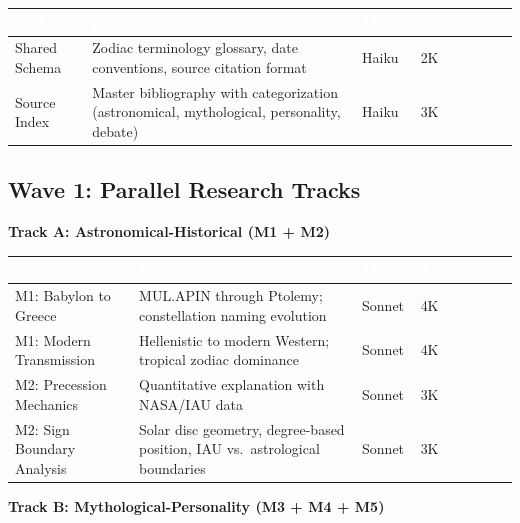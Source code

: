 \documentclass[11pt,letterpaper]{article}
\newcommand{\tableheader}[1]{\textbf{\sffamily\textcolor{white}{#1}}}
\begin{document}
\begin{center}
\begin{tabularx}{\textwidth}{L{3cm}XC{1.5cm}C{1.5cm}}
\toprule
{}
\tableheader{Task} & \tableheader{Description} & \tableheader{Model} & \tableheader{Est.\ Tokens} \\
\midrule
Shared Schema & Zodiac terminology glossary, date conventions, source citation format & Haiku & 2K \\
Source Index & Master bibliography with categorization (astronomical, mythological, personality, debate) & Haiku & 3K \\
\bottomrule
\end{tabularx}
\end{center}

\subsection{Wave 1: Parallel Research Tracks}

\textbf{Track A: Astronomical-Historical (M1 + M2)}

\begin{center}
\begin{tabularx}{\textwidth}{L{3cm}XC{1.5cm}C{1.5cm}}
\toprule
{}
\tableheader{Task} & \tableheader{Description} & \tableheader{Model} & \tableheader{Est.\ Tokens} \\
\midrule
M1: Babylon to Greece & MUL.APIN through Ptolemy; constellation naming evolution & Sonnet & 4K \\
M1: Modern Transmission & Hellenistic to modern Western; tropical zodiac dominance & Sonnet & 4K \\
M2: Precession Mechanics & Quantitative explanation with NASA/IAU data & Sonnet & 3K \\
M2: Sign Boundary Analysis & Solar disc geometry, degree-based position, IAU vs.\ astrological boundaries & Sonnet & 3K \\
\bottomrule
\end{tabularx}
\end{center}

\textbf{Track B: Mythological-Personality (M3 + M4 + M5)}
\end{document}
